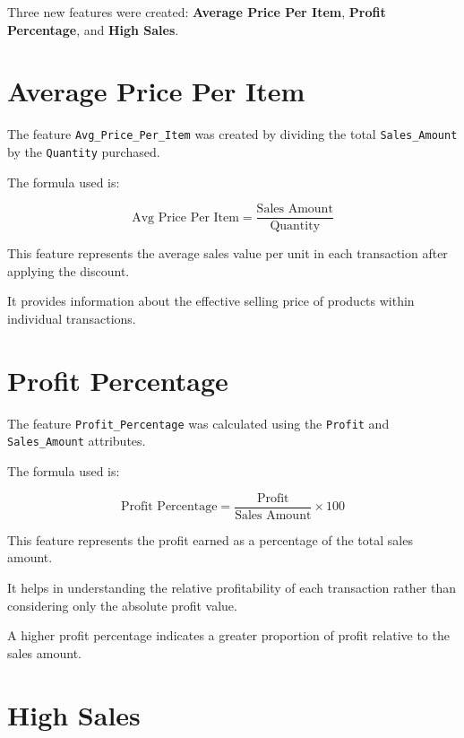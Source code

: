 \documentclass[12pt,a4paper]{report}
\begin{document}
Three new features were created:
\textbf{Average Price Per Item},
\textbf{Profit Percentage}, and
\textbf{High Sales}.


\section{Average Price Per Item}

The feature \texttt{Avg\_Price\_Per\_Item}
was created by dividing the total
\texttt{Sales\_Amount} by the
\texttt{Quantity} purchased.

The formula used is:

\[
\text{Avg Price Per Item}
=
\frac{\text{Sales Amount}}{\text{Quantity}}
\]

This feature represents the average
sales value per unit in each transaction
after applying the discount.

It provides information about the
effective selling price of products
within individual transactions.


\section{Profit Percentage}

The feature \texttt{Profit\_Percentage}
was calculated using the
\texttt{Profit} and
\texttt{Sales\_Amount} attributes.

The formula used is:

\[
\text{Profit Percentage}
=
\frac{\text{Profit}}{\text{Sales Amount}}
\times 100
\]

This feature represents the profit
earned as a percentage of the
total sales amount.

It helps in understanding the
relative profitability of each
transaction rather than considering
only the absolute profit value.

A higher profit percentage indicates
a greater proportion of profit
relative to the sales amount.


\section{High Sales}
\end{document}
